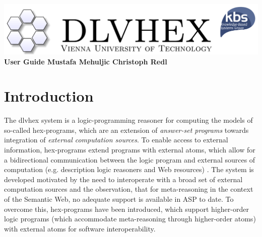 \documentclass[14pt,a4paper, titlepage]{article}
\begin{document}
\setcounter{page}{3}
\newcommand{\dlvhex}{{\sc dlvhex}}
\newcommand{\hex}{{\sc hex}}
\setcounter{secnumdepth}{4} %
\setcounter{tocdepth}{4}    %

\newtheorem{exmp}{Example}[section]


\begin{titlepage}
    \centering
    \vfill
    \includegraphics[scale=1.2]{biglogo_whitebg}
    \vfill
    {\bfseries\Large
        User Guide
        \vskip4cm
        Mustafa Mehuljic \vskip1cm Christoph Redl
    }    
    
\end{titlepage}

\begin{abstract}
This document provides a user guide for the Answer Set 
Programming (ASP) system called \dlvhex{} developed at 
Vienna University of Technology. ASP is a declarative 
problem solving paradigm, rooted in logic programming and 
nonmonotonic reasoning, which has been gaining increasing 
attention during the last years. The \dlvhex{} system is a 
reasoner for computing the models of so-called \hex{}-
programs, which are an extension of \emph{answer-set 
programs} towards integration of \emph{external computation 
sources}. This guide aims at enabling users of this system 
to interoperate with a broad set of external computation 
sources. The guide refers to release 2.4.     
\end{abstract}

\tableofcontents
\newpage

\section{Introduction} %
\label{sec:intro}
The \dlvhex{} system is a logic-programming reasoner for 
computing the models of so-called \hex{}-programs, which 
are an extension of \emph{answer-set programs} towards 
integration of \emph{external computation sources}. To 
enable access to external information, \hex{}-programs 
extend programs with external atoms, which allow for a 
bidirectional communication between the logic program and 
external sources of computation (e.g. description logic 
reasoners and Web resources) \cite{DUMMY:1}. The system is 
developed motivated by the need to interoperate with a 
broad set of external computation sources and the 
observation, that for meta-reasoning in the context of the 
Semantic Web, no adequate support is available in ASP to 
date. To overcome this, \hex{}-programs have been 
introduced, which support higher-order logic programs 
(which accommodate meta-reasoning through higher-order 
atoms) with external atoms for software interoperability.
\end{document}
